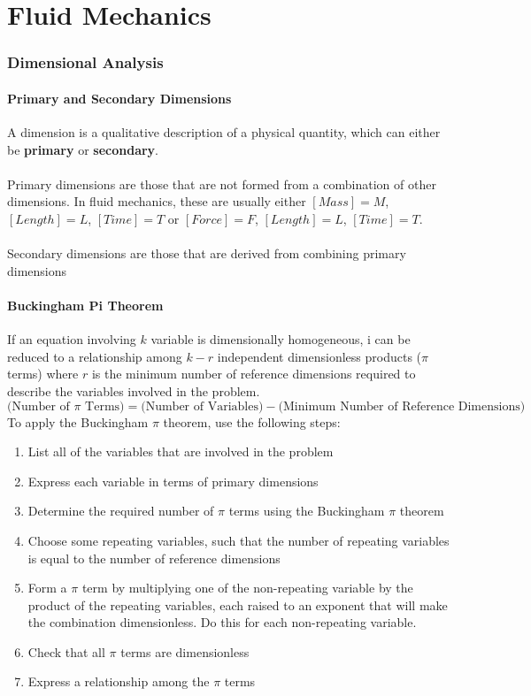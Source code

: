 \documentclass[11pt]{article}
\begin{document}
\bigskip
\bigskip
\bigskip
\bigskip
\bigskip
\bigskip
\part{Fluid Mechanics}
\pagebreak
\section{Dimensional Analysis}
\subsection{Primary and Secondary Dimensions}
A dimension is a qualitative description of a physical quantity, which can either be \textbf{primary} or \textbf{secondary}. \\ \\ 
Primary dimensions are those that are not formed from a combination of other dimensions. In fluid mechanics, these are usually either $[Mass] = M$, $[Length] = L$, $[Time] = T$ or $[Force] = F$, $[Length] = L$, $[Time] = T$. \\ \\
Secondary dimensions are those that are derived from combining primary dimensions 
\subsection{Buckingham Pi Theorem}
If an equation involving $k$ variable is dimensionally homogeneous, i can be reduced to a relationship among $k-r$ independent dimensionless products ($\pi$ terms) where $r$ is the minimum number of reference dimensions required to describe the variables involved in the problem.
$$ \text{(Number of } \pi \text{ Terms)} = \text{(Number of Variables)} - \text{(Minimum Number of Reference Dimensions)} $$
To apply the Buckingham $\pi$ theorem, use the following steps:
\begin{enumerate}
\item List all of the variables that are involved in the problem
\item Express each variable in terms of primary dimensions
\item Determine the required number of $\pi$ terms using the Buckingham $\pi$ theorem
\item Choose some repeating variables, such that the number of repeating variables is equal to the number of reference dimensions
\item Form a $\pi$ term by multiplying one of the non-repeating variable by the product of the repeating variables, each raised to an exponent that will make the combination dimensionless. Do this for each non-repeating variable.
\item Check that all $\pi$ terms are dimensionless
\item Express a relationship among the $\pi$ terms
\end{enumerate}
\pagebreak
\end{document}
